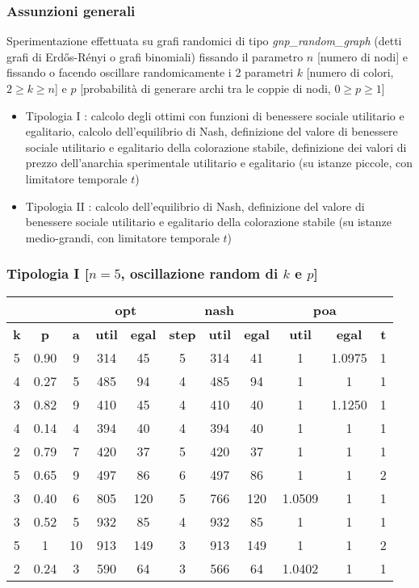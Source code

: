 \documentclass{beamer}
\begin{document}
\begin{frame}
\frametitle{Assunzioni generali}
Sperimentazione effettuata su \alert{grafi randomici} di tipo \textit{gnp\_random\_graph} (detti grafi di Erdős-Rényi o grafi binomiali) fissando il parametro \alert{$n$} [\alert{numero di nodi}] e fissando o facendo oscillare randomicamente i 2 parametri \alert{$k$} [\alert{numero di colori}, $2 \geq k \geq n$] e \alert{$p$} [\alert{probabilità di generare archi tra le coppie di nodi}, $0 \geq p \geq 1$]
\begin{itemize}
	\item \alert{Tipologia I} : calcolo degli ottimi con funzioni di benessere sociale utilitario e egalitario, calcolo dell'equilibrio di Nash, definizione del valore di benessere sociale utilitario e egalitario della colorazione stabile, definizione dei valori di prezzo dell'anarchia sperimentale utilitario e egalitario (su istanze piccole, con limitatore temporale $t$)
	\item \alert{Tipologia II} : calcolo dell'equilibrio di Nash, definizione del valore di benessere sociale utilitario e egalitario della colorazione stabile (su istanze medio-grandi, con limitatore temporale $t$)
\end{itemize}
\end{frame}


\begin{frame}
\frametitle{Tipologia I [$n=5$, oscillazione random di $k$ e $p$]}
\begin{table}[H]
\centering
\scalebox{0.9} {
\begin{tabular}{|c|c|c|c|c|c|c|c|c|c|c|}
\hline
\multicolumn{3}{|c|}{\textbf{}} & \multicolumn{2}{c|}{\textbf{\color{orange}opt}} & \multicolumn{3}{c|}{\textbf{\color{orange}nash}} & \multicolumn{2}{c|}{\textbf{\color{orange}poa}} & \textbf{} \\ \hline
\textbf{\alert{k}} & \textbf{\alert{p}} & \textbf{a} & \textbf{util} & \textbf{egal} & \textbf{step} & \textbf{util} & \textbf{egal} & \textbf{util} & \textbf{egal} & \textbf{t} \\ \hline
5 & 0.90 & 9 & 314 & 45 & 5 & 314 & 41 & 1 & 1.0975 & 1 \\ \hline
4 & 0.27 & 5 & 485 & 94 & 4 & 485 & 94 & 1 & 1 & 1 \\ \hline
3 & 0.82 & 9 & 410 & 45 & 4 & 410 & 40 & 1 & 1.1250 & 1 \\ \hline
4 & 0.14 & 4 & 394 & 40 & 4 & 394 & 40 & 1 & 1 & 1 \\ \hline
2 & 0.79 & 7 & 420 & 37 & 5 & 420 & 37 & 1 & 1 & 1 \\ \hline
5 & 0.65 & 9 & 497 & 86 & 6 & 497 & 86 & 1 & 1 & 2 \\ \hline
3 & 0.40 & 6 & 805 & 120 & 5 & 766 & 120 & 1.0509 & 1 & 1 \\ \hline
3 & 0.52 & 5 & 932 & 85 & 4 & 932 & 85 & 1 & 1 & 1 \\ \hline
5 & 1 & 10 & 913 & 149 & 3 & 913 & 149 & 1 & 1 & 2 \\ \hline
2 & 0.24 & 3 & 590 & 64 & 3 & 566 & 64 & 1.0402 & 1 & 1 \\ \hline
\end{tabular}
}
\end{table}
\end{frame}
\end{document}
